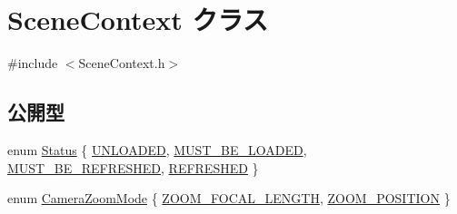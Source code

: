 \hypertarget{class_scene_context}{}\section{Scene\+Context クラス}
\label{class_scene_context}


{\ttfamily \#include $<$Scene\+Context.\+h$>$}

\subsection*{公開型}
\begin{DoxyCompactItemize}
\item 
enum \hyperlink{class_scene_context_ad0fdb258c51900e90cc206ecdff267d1}{Status} \{ \hyperlink{class_scene_context_ad0fdb258c51900e90cc206ecdff267d1a0b21309be7710270e8f874d2899e4157}{U\+N\+L\+O\+A\+D\+ED}, 
\hyperlink{class_scene_context_ad0fdb258c51900e90cc206ecdff267d1a6c9b140d16fc1e09aada9314899fe402}{M\+U\+S\+T\+\_\+\+B\+E\+\_\+\+L\+O\+A\+D\+ED}, 
\hyperlink{class_scene_context_ad0fdb258c51900e90cc206ecdff267d1a130c51bd6cc10fe91d3daa934ea285f3}{M\+U\+S\+T\+\_\+\+B\+E\+\_\+\+R\+E\+F\+R\+E\+S\+H\+ED}, 
\hyperlink{class_scene_context_ad0fdb258c51900e90cc206ecdff267d1a096d358f49b48c2147562b1938b952b1}{R\+E\+F\+R\+E\+S\+H\+ED}
 \}
\item 
enum \hyperlink{class_scene_context_a06de9da0c18152a74673a8ed829abf78}{Camera\+Zoom\+Mode} \{ \hyperlink{class_scene_context_a06de9da0c18152a74673a8ed829abf78a2a877f0410883fecc792bc00e3a9d80d}{Z\+O\+O\+M\+\_\+\+F\+O\+C\+A\+L\+\_\+\+L\+E\+N\+G\+TH}, 
\hyperlink{class_scene_context_a06de9da0c18152a74673a8ed829abf78a0203d0eeed5adfe6b7186f8998639a45}{Z\+O\+O\+M\+\_\+\+P\+O\+S\+I\+T\+I\+ON}
 \}
\end{DoxyCompactItemize}
